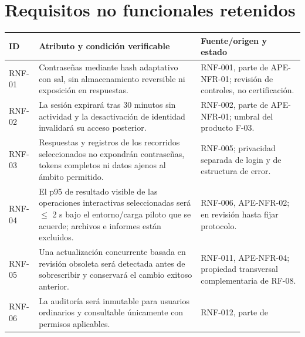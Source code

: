 \documentclass[12pt,a4paper]{report}
\begin{document}
\section{Requisitos no funcionales
retenidos}\label{dossier-requisitos-no-funcionales-retenidos}
{\def\LTcaptype{none} %
\begin{longtable}[]{@{}
  >{\raggedright\arraybackslash}p{}
  >{\raggedright\arraybackslash}p{}
  >{\raggedright\arraybackslash}p{}@{}}
\toprule\noalign{}
\begin{minipage}[b]{\linewidth}\raggedright
ID
\end{minipage} & \begin{minipage}[b]{\linewidth}\raggedright
Atributo y condición verificable
\end{minipage} & \begin{minipage}[b]{\linewidth}\raggedright
Fuente/origen y estado
\end{minipage} \\
\midrule\noalign{}
\endhead
\bottomrule\noalign{}
\endlastfoot
RNF-01 & Contraseñas mediante hash adaptativo con sal, sin
almacenamiento reversible ni exposición en respuestas. & RNF-001, parte
de APE-NFR-01; revisión de controles, no certificación. \\
RNF-02 & La sesión expirará tras 30 minutos sin actividad y la
desactivación de identidad invalidará su acceso posterior. & RNF-002,
parte de APE-NFR-01; umbral del producto F-03. \\
RNF-03 & Respuestas y registros de los recorridos seleccionados no
expondrán contraseñas, tokens completos ni datos ajenos al ámbito
permitido. & RNF-005; privacidad separada de login y de estructura de
error. \\
RNF-04 & El p95 de resultado visible de las operaciones interactivas
seleccionadas será \ensuremath{\leq} 2 s bajo el entorno/carga piloto que se acuerde;
archivos e informes están excluidos. & RNF-006, APE-NFR-02; en revisión
hasta fijar protocolo. \\
RNF-05 & Una actualización concurrente basada en revisión obsoleta
será detectada antes de sobrescribir y conservará el cambio exitoso
anterior. & RNF-011, APE-NFR-04; propiedad transversal complementaria de
RF-08. \\
RNF-06 & La auditoría será inmutable para usuarios ordinarios y
consultable únicamente con permisos aplicables. & RNF-012, parte de

\end{longtable}}
\end{document}
